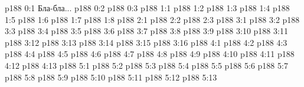 \author{Промежуточные создания}
\vs p188 0:1  Бла-бла...
\vs p188 0:2 
\vs p188 0:3 
\vs p188 1:1 
\vs p188 1:2 
\vs p188 1:3 
\vs p188 1:4 
\vs p188 1:5 
\vs p188 1:6 
\vs p188 1:7 
\vs p188 1:8 
\vs p188 2:1 
\vs p188 2:2 
\vs p188 2:3 
\vs p188 3:1 
\vs p188 3:2 
\vs p188 3:3 
\vs p188 3:4 \pc 
\vs p188 3:5 
\vs p188 3:6 
\vs p188 3:7 
\vs p188 3:8 
\vs p188 3:9 
\vs p188 3:10 \pc 
\vs p188 3:11 
\vs p188 3:12 
\vs p188 3:13 
\vs p188 3:14 
\vs p188 3:15 
\vs p188 3:16 
\vs p188 4:1 
\vs p188 4:2 
\vs p188 4:3 \pc 
\vs p188 4:4 
\vs p188 4:5 
\vs p188 4:6 
\vs p188 4:7 
\vs p188 4:8 
\vs p188 4:9 
\vs p188 4:10 
\vs p188 4:11 
\vs p188 4:12 
\vs p188 4:13 
\vs p188 5:1 
\vs p188 5:2 
\vs p188 5:3 
\vs p188 5:4 \pc 
\vs p188 5:5 \pc 
\vs p188 5:6 
\vs p188 5:7 
\vs p188 5:8 
\vs p188 5:9 \pc 
\vs p188 5:10 
\vs p188 5:11 
\vs p188 5:12 \pc 
\vs p188 5:13 
\quizlink
